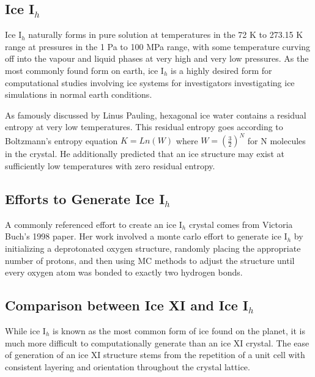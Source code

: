 \subsection{Ice I$_{h}$}

Ice I$_{h}$ naturally forms in pure solution at temperatures in the 72 K to 273.15 K range at pressures in the 1 Pa to 100 MPa range, with some temperature curving off into the vapour and liquid phases at very high and very low pressures.
As the most commonly found form on earth, ice I$_{h}$ is a highly desired form for computational studies involving ice systems for investigators investigating ice simulations in normal earth conditions.

As famously discussed by Linus Pauling, hexagonal ice water contains a residual entropy at very low temperatures.\cite{PaulingIce} 
This residual entropy goes according to Boltzmann's entropy equation $K=Ln(W)$ where $W=(\frac{3}{2})^{N}$ for N molecules in the crystal.
He additionally predicted that an ice structure may exist at sufficiently low temperatures with zero residual entropy.


\subsection{Efforts to Generate Ice I$_{h}$}


A commonly referenced effort to create an ice I$_{h}$ crystal comes from Victoria Buch's 1998 paper. \cite{MCIce}
Her work involved a monte carlo effort to generate ice I$_{h}$ by initializing a deprotonated oxygen structure, randomly placing the appropriate number of protons, and then using MC methods to adjust the structure until every oxygen atom was bonded to exactly two hydrogen bonds.


\subsection{Comparison between Ice XI and Ice I$_{h}$}

While ice I$_{h}$ is known as the most common form of ice found on the planet, it is much more difficult to computationally generate than an ice XI crystal. 
The ease of generation of an ice XI structure stems from the repetition of a unit cell with consistent layering and orientation throughout the crystal lattice. 


